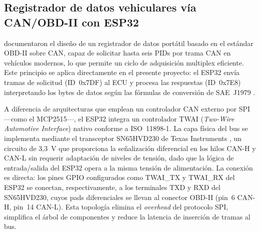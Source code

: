 %
%

\subsection{Registrador de datos vehiculares vía CAN/OBD-II con ESP32}

\citet{ICCT2013} documentaron el diseño de un registrador de
datos portátil basado en el estándar OBD-II sobre CAN, capaz
de solicitar hasta seis PIDs por trama CAN en vehículos
modernos, lo que permite un ciclo de adquisición multiplex
eficiente.  Este principio se aplica directamente en el
presente proyecto: el ESP32 envía tramas de solicitud
(\mbox{ID~0x7DF}) al ECU y procesa las respuestas
(\mbox{ID~0x7E8}) interpretando los bytes de datos según las
fórmulas de conversión de SAE~J1979 \citep{sae_j1979_2014}.

A diferencia de arquitecturas que emplean un controlador CAN
externo por SPI ---como el MCP2515---, el ESP32 integra un
controlador \mbox{TWAI} (\textit{Two-Wire Automotive
	Interface}) nativo conforme a ISO~11898-1.
La capa física del bus se implementa mediante el transceptor
SN65HVD230 de Texas Instruments
\citep{sn65hvd230_datasheet}, un circuito de 3{,}3~V que
proporciona la señalización diferencial en los hilos
\mbox{CAN-H} y \mbox{CAN-L} sin requerir adaptación de
niveles de tensión, dado que la lógica de entrada/salida del
ESP32 opera a la misma tensión de alimentación.  La conexión
es directa: los pines GPIO configurados como TWAI\_TX y
TWAI\_RX del ESP32 se conectan, respectivamente, a los
terminales TXD y RXD del SN65HVD230, cuyos pads diferenciales
se llevan al conector OBD-II (pin~6 \mbox{CAN-H},
pin~14 \mbox{CAN-L}).  Esta topología elimina el
\textit{overhead} del protocolo SPI, simplifica el árbol de
componentes y reduce la latencia de inserción de tramas al
bus.


